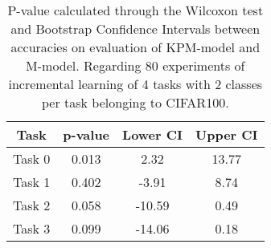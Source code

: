 \begin{table}[H]
\centering
\begin{tabular}{cccc}
\toprule
Task & p-value & Lower CI & Upper CI \\
\midrule
Task 0 & 0.013 &2.32 & 13.77 \\
Task 1 & 0.402 &-3.91 & 8.74 \\
Task 2 & 0.058 &-10.59 & 0.49 \\
Task 3 & 0.099 &-14.06 & 0.18 \\
\bottomrule
\end{tabular}
\caption{P-value calculated through the Wilcoxon test and Bootstrap Confidence Intervals between accuracies on evaluation of KPM-model and M-model. Regarding 80 experiments of incremental learning of 4 tasks with 2 classes per task belonging to CIFAR100.}
\end{table}
